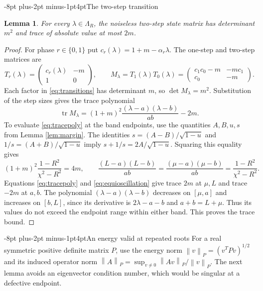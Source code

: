 \documentclass[pdflatex,sn-mathphys-num]{sn-jnl}
\makeatletter
\renewcommand\subsection{\@startsection{subsection}{2}{\z@}%
  {-8pt plus-2pt minus-1pt}{4pt}{\subsectionfont}}
\theoremstyle{thmstyleone}
\newtheorem{lemma}{Lemma}
\theoremstyle{thmstyletwo}
\newcommand{\tr}{\operatorname{tr}}
\newcommand{\norm}[1]{\left\lVert #1\right\rVert}
\makeatother
\begin{document}
\subsection{The two-step transition}
\begin{lemma}\label{lem:trace}
For every $\lambda\in\Lambda_R$, the noiseless two-step state matrix
has determinant $m^2$ and trace of absolute value at most $2m$.
\end{lemma}
\begin{proof}
For phase $r\in\{0,1\}$ put $c_r(\lambda)=1+m-\alpha_r\lambda$.
The one-step and two-step matrices are
\begin{equation}\label{eq:transitions}
 T_r(\lambda)=\begin{pmatrix}c_r(\lambda)&-m\\1&0\end{pmatrix},
 \qquad
 M_\lambda=T_1(\lambda)T_0(\lambda)
   =\begin{pmatrix}c_1c_0-m&-mc_1\\c_0&-m\end{pmatrix}.
\end{equation}
Each factor in \eqref{eq:transitions} has determinant $m$, so
$\det M_\lambda=m^2$. Substitution of the step sizes gives
the trace polynomial
\begin{equation}\label{eq:tracepoly}
 \tr M_\lambda
   =(1+m)^2\frac{(\lambda-a)(\lambda-b)}{ab}-2m .
\end{equation}
To evaluate \eqref{eq:tracepoly} at the band endpoints, use the
quantities $A,B,u,s$ from Lemma \ref{lem:margin}.
The identities
$s=(A-B)/\sqrt{1-u}$ and $1/s=(A+B)/\sqrt{1-u}$ imply
$s+1/s=2A/\sqrt{1-u}$. Squaring this equality gives
\begin{equation}\label{eq:equioscillation}
 (1+m)^2\frac{1-R^2}{\chi^2-R^2}=4m,\qquad
 \frac{(L-a)(L-b)}{ab}
 =\frac{(\mu-a)(\mu-b)}{ab}
 =\frac{1-R^2}{\chi^2-R^2}.
\end{equation}
Equations \eqref{eq:tracepoly} and \eqref{eq:equioscillation}
give trace $2m$ at $\mu,L$ and trace $-2m$ at $a,b$.
The polynomial $(\lambda-a)(\lambda-b)$ decreases on $[\mu,a]$
and increases on $[b,L]$, since its derivative is $2\lambda-a-b$
and $a+b=L+\mu$. Thus its values do not exceed the endpoint
range within either band. This proves the trace bound.
\end{proof}

\subsection{An energy valid at repeated roots}
For a real symmetric positive definite matrix $P$, use the energy
norm $\norm{v}_P=(v^TPv)^{1/2}$ and its induced operator norm
$\norm{A}_P=\sup_{v\ne0}\norm{Av}_P/\norm{v}_P$.
The next lemma avoids an eigenvector condition number, which would
be singular at a defective endpoint.
\end{document}
